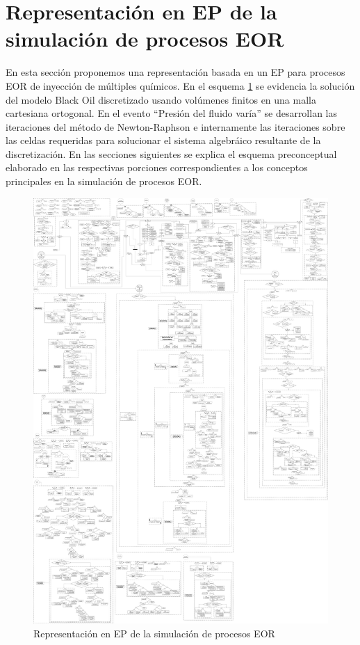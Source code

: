 \section{Representación en EP de la simulación de procesos EOR}\label{sec:PS_EOR}
En esta sección proponemos una representación basada en un EP para procesos EOR de inyección de múltiples químicos. En el esquema \ref{fig:PSComplete} se evidencia la solución del modelo Black Oil discretizado usando volúmenes finitos en una malla cartesiana ortogonal. En el evento ``Presión del fluido varía'' se desarrollan las iteraciones del método de Newton-Raphson e internamente las iteraciones sobre las celdas requeridas para solucionar el sistema algebráico resultante de la discretización. En las secciones siguientes se explica el esquema preconceptual elaborado en las respectivas porciones correspondientes a los conceptos principales en la simulación de procesos EOR.
\begin{figure}[h]
\centering%
\includegraphics[width=0.9\linewidth]{Kap4/MultifasicoSinPozos.pdf}%
\caption{Representación en EP de la simulación de procesos EOR} \label{fig:PSComplete}
\end{figure}
